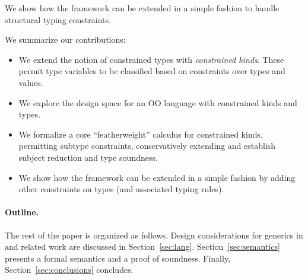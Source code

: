 We show how the framework can be extended in a simple fashion to
handle structural typing constraints.

We summarize our contributions:
\begin{itemize}

\item We extend the notion of constrained types \cite{constrained-types} with {\em constrained kinds}. These permit type variables to be classified based on constraints over types and values. 
\item We explore the design space for an OO language with constrained kinds and types.
\item We formalize a core ``featherweight'' calculus for constrained kinds, permitting subtype constraints, conservatively extending \cite{constrained-types} and establish subject reduction and type soundness.
\item 
We show how the framework can be extended in a simple fashion by adding other constraints on types (and associated typing rules).
\end{itemize}

\paragraph{Outline.}

The rest of the paper is organized as follows.
%
Design considerations for generics in \Xten{}
and related work are
discussed in Section~\ref{sec:lang}.
%
Section~\ref{sec:semantics} presents a formal semantics and a
proof of soundness.
%
Finally, Section~\ref{sec:conclusions} concludes.


